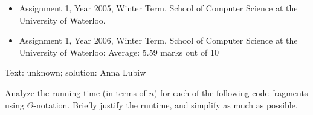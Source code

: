 \begin{usage}
\begin{itemize}
\item Assignment 1, Year 2005, Winter Term, School of Computer Science
  at the University of Waterloo.
\item Assignment 1, Year 2006, Winter Term, School of Computer Science
  at the University of Waterloo: Average: 5.59 marks out of 10
\end{itemize}
\end{usage}
\begin{authorship}
Text: unknown; solution: Anna Lubiw
\end{authorship}

Analyze the running time (in terms of $n$) for each of the following
code fragments using $\Theta$-notation.  Briefly justify the runtime,
and simplify as much as possible.
